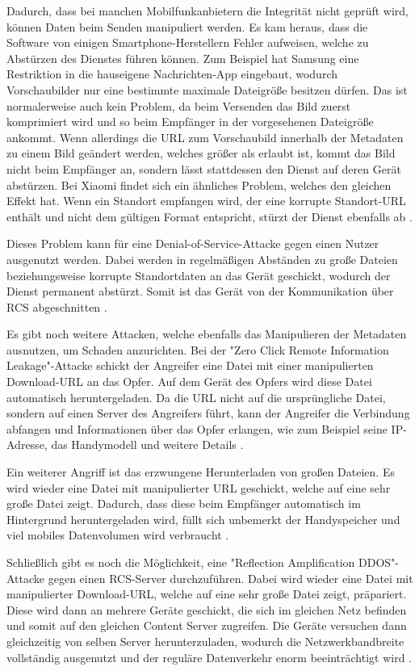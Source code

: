 \documentclass[conference]{IEEEtran}
\begin{document}
Dadurch, dass bei manchen Mobilfunkanbietern die Integrität nicht geprüft wird, können Daten beim Senden manipuliert werden.
Es kam heraus, dass die Software von einigen Smartphone-Herstellern Fehler aufweisen, welche zu Abstürzen des Dienstes führen können.
Zum Beispiel hat Samsung eine Restriktion in die hauseigene Nachrichten-App eingebaut, wodurch Vorschaubilder nur eine bestimmte maximale Dateigröße besitzen dürfen.
Das ist normalerweise auch kein Problem, da beim Versenden das Bild zuerst komprimiert wird und so beim Empfänger in der vorgesehenen Dateigröße ankommt.
Wenn allerdings die URL zum Vorschaubild innerhalb der Metadaten zu einem Bild geändert werden, welches größer als erlaubt ist, kommt das Bild nicht beim Empfänger an, sondern lässt stattdessen den Dienst auf deren Gerät abstürzen.
Bei Xiaomi findet sich ein ähnliches Problem, welches den gleichen Effekt hat.
Wenn ein Standort empfangen wird, der eine korrupte Standort-URL enthält und nicht dem gültigen Format entspricht, stürzt der Dienst ebenfalls ab \cite{uncoversec}.

Dieses Problem kann für eine Denial-of-Service-Attacke gegen einen Nutzer ausgenutzt werden.
Dabei werden in regelmäßigen Abständen zu große Dateien beziehungsweise korrupte Standortdaten an das Gerät geschickt, wodurch der Dienst permanent abstürzt.
Somit ist das Gerät von der Kommunikation über RCS abgeschnitten \cite{uncoversec}.

Es gibt noch weitere Attacken, welche ebenfalls das Manipulieren der Metadaten ausnutzen, um Schaden anzurichten.
Bei der "Zero Click Remote Information Leakage"-Attacke schickt der Angreifer eine Datei mit einer manipulierten Download-URL an das Opfer.
Auf dem Gerät des Opfers wird diese Datei automatisch heruntergeladen.
Da die URL nicht auf die ursprüngliche Datei, sondern auf einen Server des Angreifers führt, kann der Angreifer die Verbindung abfangen und Informationen über das Opfer erlangen, wie zum Beispiel seine IP-Adresse, das Handymodell und weitere Details \cite{uncoversec}.

Ein weiterer Angriff ist das erzwungene Herunterladen von großen Dateien.
Es wird wieder eine Datei mit manipulierter URL geschickt, welche auf eine sehr große Datei zeigt.
Dadurch, dass diese beim Empfänger automatisch im Hintergrund heruntergeladen wird, füllt sich unbemerkt der Handyspeicher und viel mobiles Datenvolumen wird verbraucht \cite{uncoversec}.

Schließlich gibt es noch die Möglichkeit, eine "Reflection Amplification DDOS"-Attacke gegen einen RCS-Server durchzuführen.
Dabei wird wieder eine Datei mit manipulierter Download-URL, welche auf eine sehr große Datei zeigt, präpariert.
Diese wird dann an mehrere Geräte geschickt, die sich im gleichen Netz befinden und somit auf den gleichen Content Server zugreifen.
Die Geräte versuchen dann gleichzeitig von selben Server herunterzuladen, wodurch die Netzwerkbandbreite vollständig ausgenutzt und der reguläre Datenverkehr enorm beeinträchtigt wird \cite{uncoversec}.
\end{document}
